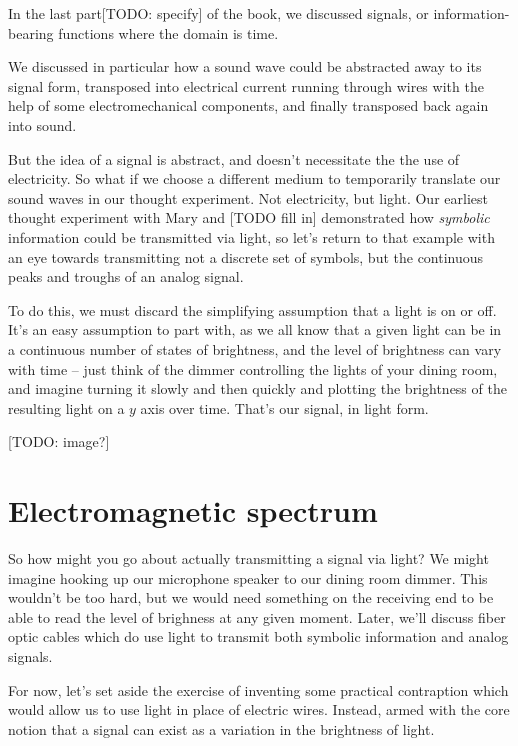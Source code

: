 \documentclass[UTF8]{book}
\begin{document}
\begin{CJK}{UTF8}{gbsn}
In the last part[TODO: specify] of the book, we discussed signals, or information-bearing functions where the domain is time.

We discussed in particular how a sound wave could be abstracted away to its signal form, transposed into electrical current running through wires with the help of some electromechanical components, and finally transposed back again into sound.

But the idea of a signal is abstract, and doesn't necessitate the the use of electricity. So what if we choose a different medium to temporarily translate our sound waves in our thought experiment. Not electricity, but light. Our earliest thought experiment with Mary and [TODO fill in] demonstrated how \emph{symbolic} information could be transmitted via light, so let's return to that example with an eye towards transmitting not a discrete set of symbols, but the continuous peaks and troughs of an analog signal.

To do this, we must discard the simplifying assumption that a light is on or off. It's an easy assumption to part with, as we all know that a given light can be in a continuous number of states of brightness, and the level of brightness can vary with time -- just think of the dimmer controlling the lights of your dining room, and imagine turning it slowly and then quickly and plotting the brightness of the resulting light on a $y$ axis over time. That's our signal, in light form.

[TODO: image?]

\chapter{Electromagnetic spectrum}

So how might you go about actually transmitting a signal via light? We might imagine hooking up our microphone speaker to our dining room dimmer. This wouldn't be too hard, but we would need something on the receiving end to be able to read the level of brighness at any given moment. Later, we'll discuss fiber optic cables which do use light to transmit both symbolic information and analog signals.

For now, let's set aside the exercise of inventing some practical contraption which would allow us to use light in place of electric wires. Instead, armed with the core notion that a signal can exist as a variation in the brightness of light.





\end{CJK}
\end{document}
